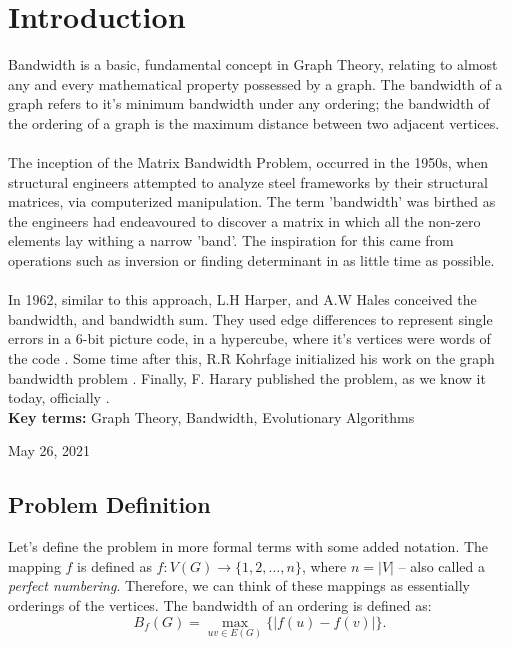 \documentclass[conference,compsoc]{IEEEtran}
\begin{document}
\section{Introduction} \label{intro}
Bandwidth is a basic, fundamental concept in Graph Theory, relating to almost any and every 
mathematical property possessed by a graph. The bandwidth of a graph refers to it's minimum 
bandwidth under any ordering; the bandwidth of the ordering of a graph is the maximum distance between two adjacent vertices.
\\
\\
The inception of the Matrix Bandwidth Problem, occurred in the 1950s, when structural engineers 
attempted to analyze steel frameworks by their structural matrices, via computerized manipulation. The term 'bandwidth' was birthed as the engineers had endeavoured to discover a matrix in which all the non-zero elements lay withing a narrow 'band'. The inspiration for this came from operations such as inversion or finding determinant in as little time as possible.
\\
\\
In 1962, similar to this approach, L.H Harper, and A.W Hales conceived the bandwidth, 
and bandwidth sum. They used edge differences to represent single errors in a 6-bit picture code, 
in a hypercube, where it's vertices were words of the code \cite{10.2307/2946514}. Some time after this, 
R.R Kohrfage initialized his work on the graph bandwidth problem \cite{ccdg1982}. Finally, F. Harary 
published the problem, as we know it today, officially \cite{https://doi.org/10.1002/bimj.19660080427}.
\\
\textbf{Key terms:} Graph Theory, Bandwidth, Evolutionary Algorithms
 
\hfill May 26, 2021

\subsection{Problem Definition}
Let's define the problem in more formal terms with some added notation. 
The mapping $f$ is defined as $f: V(G) \to \{1, 2, \dots, n\}$, where $n = |V|$ -- also called 
a \emph{perfect numbering}. \cite{Lee2016} Therefore, 
we can think of these mappings as essentially orderings of the vertices. The bandwidth of an ordering is defined as:
\begin{equation}
B_f(G) = \max_{uv \in E(G)}\{|f(u) - f(v)|\}.
\end{equation}
\end{document}
